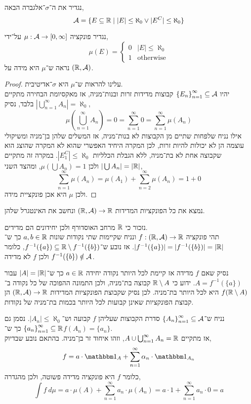 \question{}
נגדיר את ה־$\sigma$־אלגברה הבאה,
\[
	\mathcal{A} = \{ E \subseteq \mathbb{R} \mid |E| \le \aleph_0 \lor |E^C| \le \aleph_0 \}
\]

\subquestion{}
נגדיר פונקציה $\mu : \mathcal{A} \to [0, \infty]$ על־ידי,
\[
	\mu(E)
	= \begin{cases}
		0 & |E| \le \aleph_0 \\
		1 & \text{otherwise}
	\end{cases}
\]
נראה ש־$\mu$ היא מידה על $(\mathbb{R}, \mathcal{A})$.
\begin{proof}
	עלינו להראות ש־$\mu$ היא $\sigma$־אדיטיבית. \\
	יהיו ${\{ E_n \}}_{n = 1}^\infty \subseteq \mathcal{A}$ קבוצות מדידות זרות ובנות־מניה, אז מאקסיומת הבחירה מתקיים $|\bigcup_{n = 1}^\infty A_n| = \aleph_0$ בלבד, נסיק,
	\[
		\mu(\bigcup_{n = 1}^\infty A_n)
		= 0
		= \sum_{n = 1}^\infty 0
		= \sum_{n = 1}^\infty \mu(A_n)
	\]
	אילו נניח שלפחות שתיים מן הקבוצות לא בנות־מניה, אז המשלים שלהן בן־מניה ומשיקולי עוצמה הן לא יכולות להיות זרות, לכן המקרה היחיד האפשרי שהוא לא המקרה שהוצג הוא שקבוצה אחת לא בת־מניה, ללא הגבלת הכלליות $|E_1^C| \le \aleph_0$.
	במקרה זה מתקיים $|\bigcup A_n| = |\mathbb{R}|$ ולכן $\mu(\bigcup A_n) = 1$, ומהצד השני,
	\[
		\sum_{n = 1}^\infty \mu(A_n)
		= \mu(A_1) + \sum_{n = 2}^\infty \mu(A_n)
		= 1 + 0
	\]
	ולכן $\mu$ היא אכן פונקציית מידה.
\end{proof}

\subquestion{}
נמצא את כל הפונקציות המדידות $(\mathbb{R}, \mathcal{A}) \to \mathbb{R}$ ונחשב את האינטגרל שלהן.
\begin{solution}
	נזכור כי $\mathbb{R}$ מרחב האוסדורף ולכן יחידונים הם מדידים. \\
	תהי פונקציה $f : (\mathbb{R}, \mathcal{A}) \to \mathbb{R}$ ונניח שקיימות שתי נקודות שונות $a, b \in \mathbb{R}$ כך ש־$|f^{-1}(\{a\})| = |f^{-1}(\{b\})| = |\mathbb{R}|$.
	אז נובע ש־$f^{-1}(\{a\}) \subseteq \mathbb{R} \setminus f^{-1}(\{b\})$, כלומר $f^{-1}(\{b\}) \notin \mathcal{A}$ ולכן $f$ לא מדידה.

	נסיק שאם $f$ מדידה אז קיימת לכל היותר נקודה יחידה $a \in \mathbb{R}$ כך ש־$|A| = |\mathbb{R}|$ עבור $A = f^{-1}(\{a\})$.
	ידוע כי $\mathbb{R} \setminus A$ קבוצה בת־מניה, ולכן התמונה ההפוכה של כל נקודה ב־$f(\mathbb{R} \setminus A)$ היא לכל היותר בת־מניה.
	לכן נסיק שקבוצת הפונקציות המדידות $(\mathbb{R}, \mathcal{A}) \to \mathbb{R}$ הן קבוצת הפונקציות שאינן קבועות לכל היותר בכמות בת־מניה של נקודות.

	נניח ש־${\{ A_n \}}_{n = 1}^\infty \subseteq \mathcal{A}$ סדרת הקבוצות שעליהן $f$ קבועה וש־$|A_n| \le \aleph_0$.
	נסמן גם ${\{ a_n \}}_{n = 1}^\infty \subseteq \mathbb{R}$ כך ש־$f(A_n) = \{ a_n \}$. \\
	אז מתקיים $A \cup \bigcup_{n = 1}^\infty A_n = \mathbb{R}$, וזהו איחוד זר בן־מניה.
	בהתאם נובע שבדיוק,
	\[
		f = a \cdot \indicator_A + \sum_{n = 1}^\infty \alpha_n \cdot \indicator_{A_n}
	\]
	כלומר $f$ היא פונקציה מדידה פשוטה, ולכן מהגדרה,
	\[
		\int f\ d\mu
		= a \cdot \mu(A) + \sum_{n = 1}^\infty a_n \cdot \mu(A_n)
		= a \cdot 1 + \sum_{n = 1}^\infty a_n \cdot 0
		= a
	\]
\end{solution}


